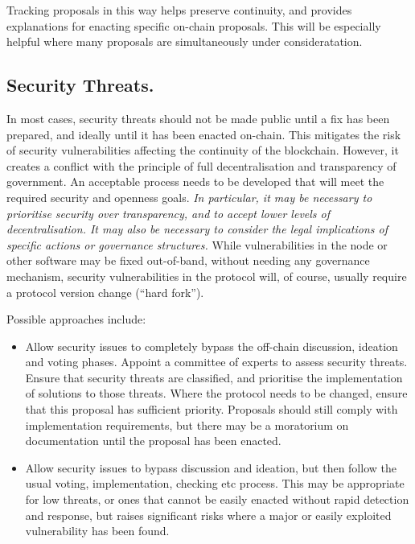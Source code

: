 Tracking proposals in this way helps preserve continuity, and provides explanations for enacting specific on-chain proposals.  This will be especially helpful where many proposals
are simultaneously under consideratation.


\subsection{Security Threats.}

In most cases, security threats should not be made public until a fix has been prepared, and ideally until it has been enacted on-chain.  This mitigates the risk of
security vulnerabilities affecting the continuity of the blockchain. However, it creates a conflict with the
principle of full decentralisation and transparency of government.  An acceptable process needs to be developed that will meet the required security and openness goals.
\emph{In particular, it may be necessary to prioritise security over transparency, and to accept lower levels of decentralisation.  It may also be necessary to consider
  the legal implications of specific actions or governance structures.}
While vulnerabilities in the node or other software may be fixed out-of-band, without needing any governance mechanism,
security vulnerabilities in the protocol will, of course, usually require a protocol version change (``hard fork'').



Possible approaches include:

\begin{itemize}
\item
  Allow security issues to completely bypass the off-chain discussion, ideation and voting phases.  Appoint a committee of experts to assess security threats.
  Ensure that security threats are classified, and prioritise the implementation of solutions to those threats.  Where the protocol needs to be changed, ensure that this
  proposal has sufficient priority.  Proposals should still comply with implementation requirements, but there may be a moratorium on documentation until the proposal has
  been enacted.
\item
  Allow security issues to bypass discussion and ideation, but then follow the usual voting, implementation, checking etc process.  This may be appropriate for low threats,
  or ones that cannot be easily enacted without rapid detection and response, but raises significant risks where a major or easily exploited vulnerability has been found.
\end{itemize}


